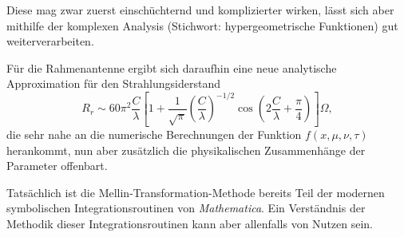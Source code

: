Diese mag zwar zuerst einschüchternd und komplizierter wirken, lässt 
sich aber mithilfe der komplexen Analysis 
(Stichwort: hypergeometrische Funktionen) gut weiterverarbeiten.

Für die Rahmenantenne ergibt sich daraufhin eine neue analytische 
Approximation für den Strahlungsiderstand 
\[
    R_r \sim 60\pi^2 \frac{C}{\lambda}
    \left[1+\frac{1}{\sqrt{\pi}}\left(\frac{C}{\lambda}\right)^{-1/2} 
    \cos\left(2\frac{C}{\lambda}+\frac{\pi}{4}\right)\right] \Omega
    ,
\]
die sehr nahe an die numerische Berechnungen der Funktion 
$f(x, \mu, \nu, \tau)$ herankommt, nun aber zusätzlich die 
physikalischen Zusammenhänge der Parameter offenbart.
\medskip

Tatsächlich ist die Mellin-Transformation-Methode bereits Teil der  
modernen symbolischen Integrationsroutinen von {\em Mathematica}.
Ein Verständnis der Methodik dieser Integrationsroutinen kann aber
allenfalls von Nutzen sein.
